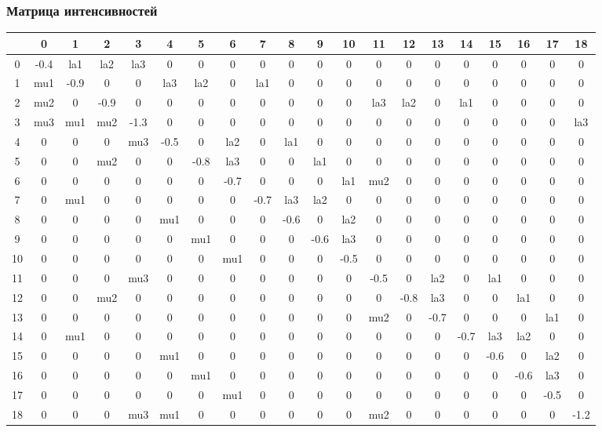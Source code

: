 \subsubsection{Матрица интенсивностей}

\begin{adjustbox}{max width=\textwidth}
\begin{tabular}{|c|c|c|c|c|c|c|c|c|c|c|c|c|c|c|c|c|c|c|c|}
\hline
  & 0 & 1 & 2 & 3 & 4 & 5 & 6 & 7 & 8 & 9 & 10 & 11 & 12 & 13 & 14 & 15 & 16 & 17 & 18 \\ \hline
0 & -0.4 & la1 & la2 & la3 & 0 & 0 & 0 & 0 & 0 & 0 & 0 & 0 & 0 & 0 & 0 & 0 & 0 & 0 & 0 \\ \hline
1 & mu1 & -0.9 & 0 & 0 & la3 & la2 & 0 & la1 & 0 & 0 & 0 & 0 & 0 & 0 & 0 & 0 & 0 & 0 & 0 \\ \hline
2 & mu2 & 0 & -0.9 & 0 & 0 & 0 & 0 & 0 & 0 & 0 & 0 & la3 & la2 & 0 & la1 & 0 & 0 & 0 & 0 \\ \hline
3 & mu3 & mu1 & mu2 & -1.3 & 0 & 0 & 0 & 0 & 0 & 0 & 0 & 0 & 0 & 0 & 0 & 0 & 0 & 0 & la3 \\ \hline
4 & 0 & 0 & 0 & mu3 & -0.5 & 0 & la2 & 0 & la1 & 0 & 0 & 0 & 0 & 0 & 0 & 0 & 0 & 0 & 0 \\ \hline
5 & 0 & 0 & mu2 & 0 & 0 & -0.8 & la3 & 0 & 0 & la1 & 0 & 0 & 0 & 0 & 0 & 0 & 0 & 0 & 0 \\ \hline
6 & 0 & 0 & 0 & 0 & 0 & 0 & -0.7 & 0 & 0 & 0 & la1 & mu2 & 0 & 0 & 0 & 0 & 0 & 0 & 0 \\ \hline
7 & 0 & mu1 & 0 & 0 & 0 & 0 & 0 & -0.7 & la3 & la2 & 0 & 0 & 0 & 0 & 0 & 0 & 0 & 0 & 0 \\ \hline
8 & 0 & 0 & 0 & 0 & mu1 & 0 & 0 & 0 & -0.6 & 0 & la2 & 0 & 0 & 0 & 0 & 0 & 0 & 0 & 0 \\ \hline
9 & 0 & 0 & 0 & 0 & 0 & mu1 & 0 & 0 & 0 & -0.6 & la3 & 0 & 0 & 0 & 0 & 0 & 0 & 0 & 0 \\ \hline
10 & 0 & 0 & 0 & 0 & 0 & 0 & mu1 & 0 & 0 & 0 & -0.5 & 0 & 0 & 0 & 0 & 0 & 0 & 0 & 0 \\ \hline
11 & 0 & 0 & 0 & mu3 & 0 & 0 & 0 & 0 & 0 & 0 & 0 & -0.5 & 0 & la2 & 0 & la1 & 0 & 0 & 0 \\ \hline
12 & 0 & 0 & mu2 & 0 & 0 & 0 & 0 & 0 & 0 & 0 & 0 & 0 & -0.8 & la3 & 0 & 0 & la1 & 0 & 0 \\ \hline
13 & 0 & 0 & 0 & 0 & 0 & 0 & 0 & 0 & 0 & 0 & 0 & mu2 & 0 & -0.7 & 0 & 0 & 0 & la1 & 0 \\ \hline
14 & 0 & mu1 & 0 & 0 & 0 & 0 & 0 & 0 & 0 & 0 & 0 & 0 & 0 & 0 & -0.7 & la3 & la2 & 0 & 0 \\ \hline
15 & 0 & 0 & 0 & 0 & mu1 & 0 & 0 & 0 & 0 & 0 & 0 & 0 & 0 & 0 & 0 & -0.6 & 0 & la2 & 0 \\ \hline
16 & 0 & 0 & 0 & 0 & 0 & mu1 & 0 & 0 & 0 & 0 & 0 & 0 & 0 & 0 & 0 & 0 & -0.6 & la3 & 0 \\ \hline
17 & 0 & 0 & 0 & 0 & 0 & 0 & mu1 & 0 & 0 & 0 & 0 & 0 & 0 & 0 & 0 & 0 & 0 & -0.5 & 0 \\ \hline
18 & 0 & 0 & 0 & mu3 & mu1 & 0 & 0 & 0 & 0 & 0 & 0 & mu2 & 0 & 0 & 0 & 0 & 0 & 0 & -1.2 \\ \hline
\end{tabular}
\end{adjustbox}

